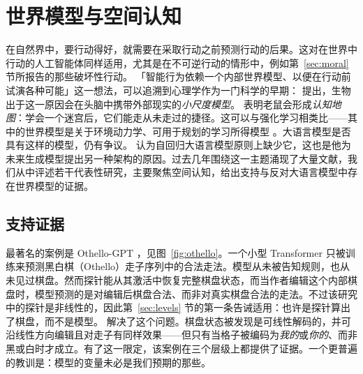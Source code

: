 \section{世界模型与空间认知}\label{sec:worldmodelscog}\label{sec:worldmodels}
在自然界中，要行动得好，就需要在采取行动之前预测行动的后果。这对在世界中行动的人工智能体同样适用，尤其是在不可逆行动的情形中，例如第~\ref{sec:moral} 节所报告的那些破坏性行动。
「智能行为依赖一个内部世界模型、以便在行动前试演各种可能」这一想法，可以追溯到心理学作为一门科学的早期：\citet{craik1943nature} 提出，生物出于这一原因会在头脑中携带外部现实的{\em 小尺度模型}。\citet{tolman1948cognitive} 表明老鼠会形成\emph{认知地图}：学会一个迷宫后，它们能走从未走过的捷径。这可以与强化学习相类比——其中的世界模型是关于环境动力学、可用于规划的学习所得模型 \citep{ha2018world}。大语言模型是否具有这样的模型，仍有争议。\citet{lecun2022path} 认为自回归大语言模型原则上缺少它，这也是他为未来生成模型提出另一种架构的原因。过去几年围绕这一主题涌现了大量文献，我们从中评述若干代表性研究，主要聚焦空间认知，给出支持与反对大语言模型中存在世界模型的证据。

\subsection{支持证据}
最著名的案例是 Othello-GPT \citep{li2023emergent}，见图~\ref{fig:othello}。一个小型 Transformer 只被训练来预测黑白棋（Othello）走子序列中的合法走法。模型从未被告知规则，也从未见过棋盘。然而探针能从其激活中恢复完整棋盘状态，而当作者编辑这个内部棋盘时，模型预测的是对编辑后棋盘合法、而非对真实棋盘合法的走法。不过该研究中的探针是非线性的，因此第~\ref{sec:levels} 节的第一条告诫适用：也许是探针算出了棋盘，而不是模型。\citet{nanda2023emergent} 解决了这个问题。棋盘状态被发现是可线性解码的，并可沿线性方向编辑且对走子有同样效果——但只有当格子被编码为{\em 我的}或{\em 你的}、而非黑或白时才成立。有了这一限定，该案例在三个层级上都提供了证据。一个更普遍的教训是：模型的变量未必是我们预期的那些。

